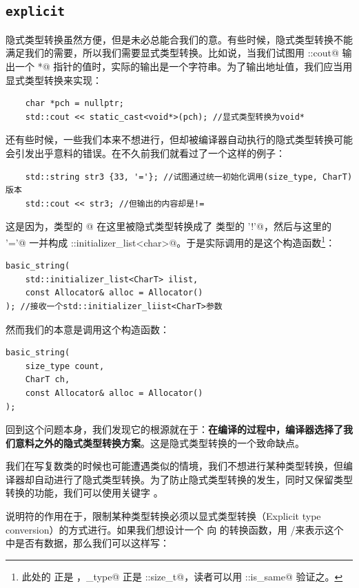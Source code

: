 \subsection*{\texttt{explicit}}
隐式类型转换虽然方便，但是未必总能合我们的意。有些时候，隐式类型转换不能满足我们的需要，所以我们需要显式类型转换。比如说，当我们试图用 \lstinline@std::cout@ 输出一个 \lstinline@char*@ 指针的值时，实际的输出是一个字符串。为了输出地址值，我们应当用显式类型转换来实现：
\begin{lstlisting}
    char *pch = nullptr;
    std::cout << static_cast<void*>(pch); //显式类型转换为void*
\end{lstlisting}\par
还有些时候，一些我们本来不想进行，但却被编译器自动执行的隐式类型转换可能会引发出乎意料的错误。在不久前我们就看过了一个这样的例子：
\begin{lstlisting}
    std::string str3 {33, '='}; //试图通过统一初始化调用(size_type, CharT)版本
    std::cout << str3; //但输出的内容却是!=
\end{lstlisting}
这是因为，\lstinline@int@ 类型的 @ 在这里被隐式类型转换成了 \lstinline@char@ 类型的 \lstinline@'!'@，然后与这里的 \lstinline@'='@ 一并构成 \lstinline@std::initializer_list<char>@。于是实际调用的是这个构造函数\footnote{此处的 \lstinline@CharT@ 正是 \lstinline@char@，\lstinline@size_type@ 正是 \lstinline@std::size_t@，读者可以用 \lstinline@std::is_same@ 验证之。}：
\begin{lstlisting}
basic_string(
    std::initializer_list<CharT> ilist,
    const Allocator& alloc = Allocator()
); //接收一个std::initializer_liist<CharT>参数
\end{lstlisting}
然而我们的本意是调用这个构造函数：
\begin{lstlisting}
basic_string(
    size_type count,
    CharT ch,
    const Allocator& alloc = Allocator()
);
\end{lstlisting}\par
回到这个问题本身，我们发现它的根源就在于：\textbf{在编译的过程中，编译器选择了我们意料之外的隐式类型转换方案}。这是隐式类型转换的一个致命缺点。\par
我们在写复数类的时候也可能遭遇类似的情境，我们不想进行某种类型转换，但编译器却自动进行了隐式类型转换。为了防止隐式类型转换的发生，同时又保留类型转换的功能，我们可以使用关键字 \lstinline@explicit@。\par\pagebreak
\lstinline@explicit@ 说明符的作用在于，限制某种类型转换必须以显式类型转换（Explicit type conversion）的方式进行。如果我们想设计一个 \lstinline@valarri@ 向 \lstinline@bool@ 的转换函数，用 \lstinline@true@/\lstinline@false@ 来表示这个 \lstinline@valarri@ 中是否有数据，那么我们可以这样写：
